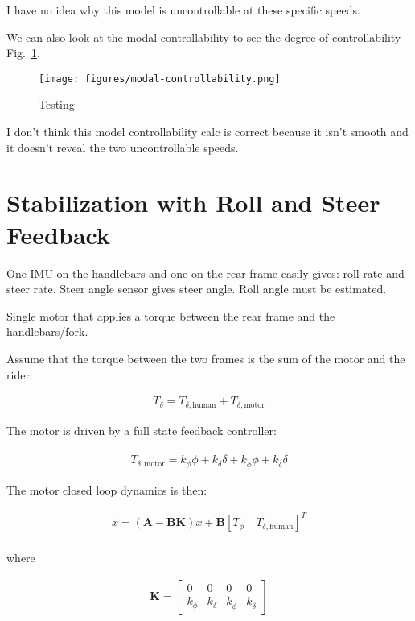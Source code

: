 \documentclass[12pt]{article}
\begin{document}
I have no idea why this model is uncontrollable at these specific speeds.

We can also look at the modal controllability to see the degree of
controllability Fig.~\ref{fig:modal-controllability}.

\begin{figure}
  \centering
  \texttt{[image: figures/modal-controllability.png]}
  \caption{Testing}
  \label{fig:modal-controllability}
\end{figure}

I don't think this model controllability calc is correct because it isn't
smooth and it doesn't reveal the two uncontrollable speeds.

\section{Stabilization with Roll and Steer Feedback}

One IMU on the handlebars and one on the rear frame easily gives: roll rate and
steer rate. Steer angle sensor gives steer angle. Roll angle must be estimated.

Single motor that applies a torque between the rear frame and the
handlebars/fork.

Assume that the torque between the two frames is the sum of the motor and the
rider:

\begin{align}
  T_\delta = T_{\delta,\textrm{human}} + T_{\delta,\textrm{motor}}
\end{align}

The motor is driven by a full state feedback controller:

\begin{align}
  T_{\delta,\textrm{motor}} =
  k_\phi \phi +
  k_\delta \delta +
  k_{\dot{\phi}} \dot{\phi} +
  k_{\dot{\delta}} \dot{\delta}
\end{align}

The motor closed loop dynamics is then:

\begin{align}
  \dot{\bar{x}} = \left( \mathbf{A} - \mathbf{B} \mathbf{K} \right) \bar{x} +
  \mathbf{B} \left[ T_\phi \quad T_{\delta,\textrm{human}} \right]^T \\
\end{align}

where

\begin{align}
  \mathbf{K} =
  \begin{bmatrix}
    0 & 0 & 0 & 0 \\
    k_\phi & k_\delta & k_{\dot{\phi}} & k_{\dot{\delta}}
  \end{bmatrix}
\end{align}
\end{document}
